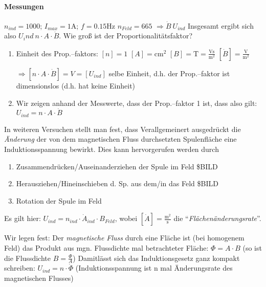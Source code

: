 \documentclass[a4paper]{scrartcl}
\begin{document}
\paragraph{Messungen}
$n_{ind} = 1000$; %
$I_{max} = 1\mathrm{A}$; %
$f=0.15\mathrm{Hz}$ %
$n_{Feld} = 665$ %
$\Rightarrow \dot{B}~U_{ind}$ %
Insgesamt ergibt sich also $U_ind ~ n \cdot A \cdot \dot{B}$. Wie groß ist der
Proportionalitätsfaktor?
\begin{enumerate}
	\item Einheit des Prop.--faktors: $[n]=1$ $[A]=\mathrm{cm^2}$
	$[B]=\mathrm{T}=
		\frac{\mathrm{Vs}}{\mathrm{m^2}}$
		$[\dot{B}]=\frac{\mathrm{V}}{\mathrm{m^2}}$
		
		$\Rightarrow [n \cdot A \cdot \dot{B}]=V=[U_{ind}]$
		selbe Einheit, d.h. der Prop.--faktor ist dimensionslos (d.h. hat keine
		Einheit)
	\item Wir zeigen anhand der Messwerte, dass der Prop.--faktor 1 ist,
		dass also gilt: $U_{ind} = n \cdot A \cdot \dot{B}$
\end{enumerate}

In weiteren Versuchen stellt man fest, dass Verallgemeinert ausgedrückt die
\emph{Änderung} der von dem magnetischen Fluss durchsetzten Spulenfläche
eine Induktionsspannung bewirkt. Dies kann hervorgerufen werden durch
\begin{enumerate}
	\item Zusammendrücken/Auseinanderziehen der Spule im Feld \$BILD %
	\item Herausziehen/Hineinschieben d. Sp. aus dem/in das Feld \$BILD %
	\item Rotation der Spule im Feld
\end{enumerate}
Es gilt hier: $U_{ind} = n_{ind} \cdot \dot{A}_{ind} \cdot B_{Feld}$,
wobei $[\dot{A}]=\frac{\mathrm{m^2}}{\mathrm{s}}$ die
"`\emph{Flächenänderungsrate}"'. %

Wir legen fest: Der \emph{magnetische Fluss} durch eine Fläche ist (bei
homogenem Feld) das Produkt aus mgn. Flussdichte mal betrachteter Fläche:
$\Phi = A \cdot B$ (so ist die Flussdichte $B=\frac{\Phi}{A}$) %
Damitlässt sich das Induktionsgesetz ganz kompakt schreiben:
$U_{ind} = n \cdot \dot{\Phi}$ (Induktionsspannung ist n mal Änderungsrate
des magnetischen Flusses)
\end{document}
